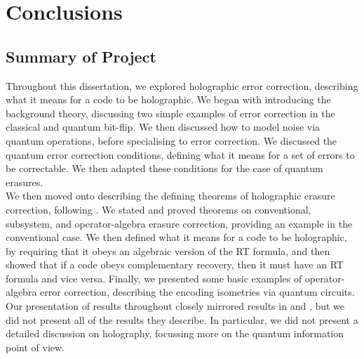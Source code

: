 \documentclass[12pt,a4paper]{report}
\numberwithin{equation}{section}
\theoremstyle{definition}
\theoremstyle{theorem}
\theoremstyle{theorem}
\theoremstyle{example}
\theoremstyle{definition}
\begin{document}
\chapter{Conclusions}

\section{Summary of Project}
Throughout this dissertation, we explored holographic error correction, describing what it means for a code to be holographic. We began with introducing the background theory, discussing two simple examples of error correction in the classical and quantum bit-flip. We then discussed how to model noise via quantum operations, before specialising to error correction. We discussed the quantum error correction conditions, defining what it means for a set of errors to be correctable. We then adapted these conditions for the case of quantum erasures.\\
We then moved onto describing the defining theorems of holographic erasure correction, following \cite{Harlow}. We stated and proved theorems on conventional, subsystem, and operator-algebra erasure correction, providing an example in the conventional case. We then defined what it means for a code to be holographic, by requiring that it obeys an algebraic version of the RT formula, and then showed that if a code obeys complementary recovery, then it must have an RT formula and vice versa. Finally, we presented some basic examples of operator-algebra error correction, describing the encoding isometries via quantum circuits.\\
Our presentation of results throughout closely mirrored results in \cite{Harlow} and \cite{Pollack}, but we did not present all of the results they describe. In particular, we did not present a detailed discussion on holography, focussing more on the quantum information point of view.
\end{document}
